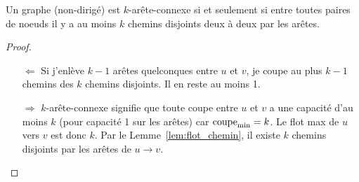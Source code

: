 \begin{mytheo}
  \label{theo:kconnexe_chemin}
  Un graphe (non-dirigé) est $k$-arête-connexe si et seulement si entre toutes paires de noeuds il y a au moins $k$ chemins disjoints deux à deux par les arêtes.
  \begin{proof}
    \begin{itemize}
      \item[$\Leftarrow$]
        Si j'enlève $k-1$ arêtes quelconques
        entre $u$ et $v$, je coupe au plus $k-1$
        chemins des $k$ chemins disjoints.
        Il en reste au moins 1.
      \item[$\Rightarrow$]
        $k$-arête-connexe signifie que toute coupe entre $u$
        et $v$ a une capacité d'au moins $k$ (pour capacité 1
        sur les arêtes) car $\operatorname{\mathrm{coupe}_\mathrm{min}} = k$.
        Le flot max de $u$ vers $v$ est donc $k$.
        Par le Lemme~\ref{lem:flot_chemin},
        il existe $k$ chemins disjoints par les arêtes de
        $u \to v$.
    \end{itemize}
  \end{proof}
\end{mytheo}

